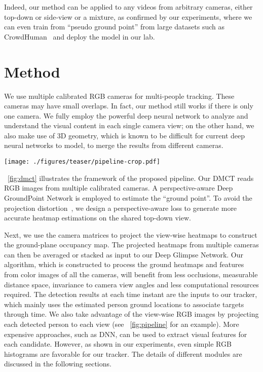 \documentclass{article}
\begin{document}
Indeed, our method can be applied to
any videos from arbitrary cameras, either top-down or side-view or a mixture, as confirmed by our experiments, where we can even train from ``pseudo ground point'' from large
datasets such as CrowdHuman~\cite{shao2018crowdhuman} and deploy the model in our lab.


\section{Method}
We use multiple calibrated RGB cameras for multi-people tracking. These cameras may have small overlaps. In fact, our
method still works if there is only one camera.  
We fully employ the powerful deep neural network to analyze and understand the visual content in each single camera view;
on the other hand,
we also make use of 3D geometry, which is known to be difficult for current deep neural networks to model, to merge
the results from different cameras.

\begin{figure*}[!htbp]
	\begin{center}
		\texttt{[image: ./figures/teaser/pipeline-crop.pdf]}
	\end{center}
	\caption{Our 3D Deep Multi-Camera Tracking pipeline.
}
	\label{fig:dmct}
\end{figure*}

\figurename~\ref{fig:dmct} illustrates the framework of the proposed pipeline.
Our DMCT reads RGB images from multiple calibrated cameras. A perspective-aware Deep GroundPoint Network is
employed to estimate the ``ground point''. To avoid the projection distortion~\cite{count19}, we design a perspective-aware loss to generate
more accurate heatmap estimations on the shared top-down view.

Next, we use the camera matrices to project the view-wise heatmaps to construct
the ground-plane occupancy map. The projected heatmaps from multiple cameras can then be averaged or stacked as input to our Deep Glimpse Network.
Our algorithm, which is constructed to process the ground heatmaps and features from color images of all the cameras, 
will benefit from less occlusions, measurable distance space, invariance to camera view angles and less computational resources required.
The detection results at each time instant are the inputs to our tracker, which mainly uses the estimated person ground locations to associate
targets through time. We also take advantage of the view-wise RGB images by projecting each detected person to
 each view (see \figurename{~\ref{fig:pipeline}} for an example). More expensive approaches, such as DNN, can be used to extract visual features for each candidate. However, as shown in our experiments,
 even simple RGB histograms are favorable for our tracker. The details of different modules are discussed in the following sections.
\end{document}
